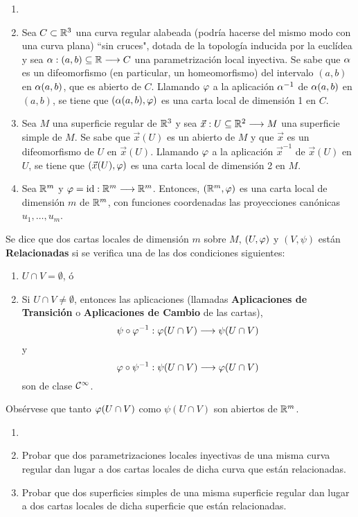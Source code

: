\documentclass[cursovd_portada.tex]{subfiles}
\begin{document}
\begin{ej}
{\rm
\begin{enumerate}
\item[]
\item Sea $C\subset\mathbb{R}^3$ una curva regular alabeada (podría
hacerse del mismo modo con una curva plana) ``sin cruces", dotada
de la topología inducida por la euclídea y sea
$\alpha:(a,b)\subseteq\mathbb{R}\longrightarrow C$ una parametrización local
inyectiva. Se sabe que $\alpha$ es un difeomorfismo (en particular, un
homeo\-mor\-fis\-mo) del intervalo $(a,b)$ en $\alpha(a,b)$, que es
abierto de $C$. Llamando $\varphi$ a la aplicación $\alpha^{-1}$ de
$\alpha(a,b)$ en $(a,b)$, se tiene que $(\alpha(a,b),\varphi)$ es una carta
local de dimensión 1 en $C$. \item Sea $M$ una superficie
regular de $\mathbb{R}^3$ y sea $\vec{x}:U\subseteq\mathbb{R}^2\longrightarrow M$ una
superficie simple de $M$. Se sabe que $\vec{x}(U)$ es un abierto
de $M$ y que $\vec{x}$ es un difeomorfismo de $U$ en $\vec{x}(U)$.
Llamando $\varphi$ a la aplicación $\vec{x}^{-1}$ de $\vec{x}(U)$
en $U$, se tiene que $(\vec{x}(U),\varphi)$ es una carta local de
dimensión 2 en $M$. \item Sea $\mathbb{R}^m$ y $\varphi={\rm
id}:\mathbb{R}^m\longrightarrow\mathbb{R}^m$. Entonces, $(\mathbb{R}^m,\varphi)$ es una carta local de
dimensión $m$ de $\mathbb{R}^m$, con funciones coordenadas las
proyecciones canónicas $u_1,\dots ,u_m$.
\end{enumerate}}
\end{ej}
\begin{defi} Se dice que dos cartas locales de dimensión $m$ sobre $M$, $(U,\varphi)$ y $(V,\psi)$ están {\bf
Relacionadas} si se verifica una de las dos condiciones siguientes:
\begin{enumerate}
\item $U\cap V=\emptyset$, ó
\item Si $U\cap V\neq\emptyset$, entonces las aplicaciones (llamadas {\bf Aplicaciones de Transición} o {\bf Aplicaciones
de Cambio} de las cartas),
$$\psi\circ\varphi^{-1}:\varphi(U\cap V)\longrightarrow\psi(U\cap V)$$
y
$$\varphi\circ\psi^{-1}:\psi(U\cap V)\longrightarrow\varphi(U\cap V)$$
son de clase ${\cal C}^{\infty}$.
\end{enumerate}
\hs Obsérvese que tanto $\varphi(U\cap V)$ como $\psi(U\cap V)$ son abiertos de $\mathbb{R}^m$.
\end{defi}
\begin{ej}
{\rm
\begin{enumerate}
\item[]
\item Probar que dos parametrizaciones locales inyectivas de una
misma curva regular dan lugar a dos cartas locales de dicha curva
que están relacionadas. \item Probar que dos superficies
simples de una misma superficie regular dan lugar a dos cartas
locales de dicha superficie que están relacionadas.
\end{enumerate}}
\end{ej}
\end{document}
